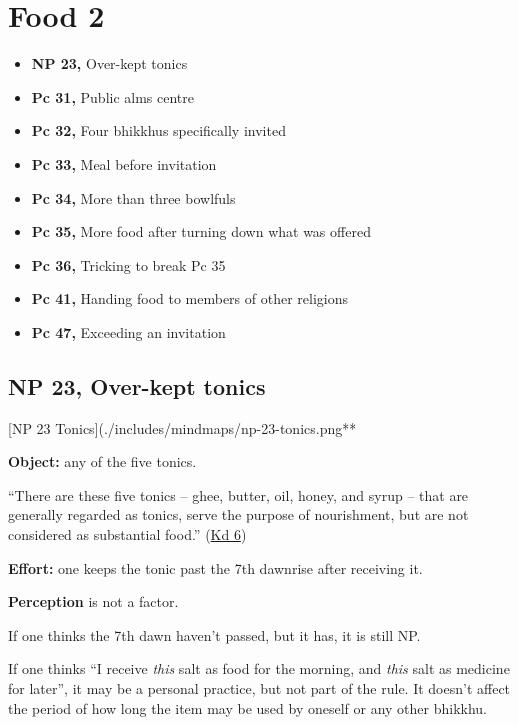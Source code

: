 \chapter{Food 2}

\begin{itemize}
\tightlist
\item
  \textbf{NP 23,} Over-kept tonics
\item
  \textbf{Pc 31,} Public alms centre
\item
  \textbf{Pc 32,} Four bhikkhus specifically invited
\item
  \textbf{Pc 33,} Meal before invitation
\item
  \textbf{Pc 34,} More than three bowlfuls
\item
  \textbf{Pc 35,} More food after turning down what was offered
\item
  \textbf{Pc 36,} Tricking to break Pc 35
\item
  \textbf{Pc 41,} Handing food to members of other religions
\item
  \textbf{Pc 47,} Exceeding an invitation
\end{itemize}

\section{NP 23, Over-kept tonics}

{[}NP 23 Tonics{]}(./includes/mindmaps/np-23-tonics.png**

\begin{multicols}{2}

\textbf{Object:} any of the five tonics.

``There are these five tonics -- ghee, butter, oil, honey, and syrup --
that are generally regarded as tonics, serve the purpose of nourishment,
but are not considered as substantial food.''
(\href{https://suttacentral.net/pli-tv-kd6/en/brahmali}{Kd 6})

\textbf{Effort:} one keeps the tonic past the 7th dawnrise after
receiving it.

\textbf{Perception} is not a factor.

If one thinks the 7th dawn haven't passed, but it has, it is still NP.

If one thinks ``I receive \emph{this} salt as food for the morning, and
\emph{this} salt as medicine for later'', it may be a personal practice,
but not part of the rule. It doesn't affect the period of how long the
item may be used by oneself or any other bhikkhu.

\end{multicols}

